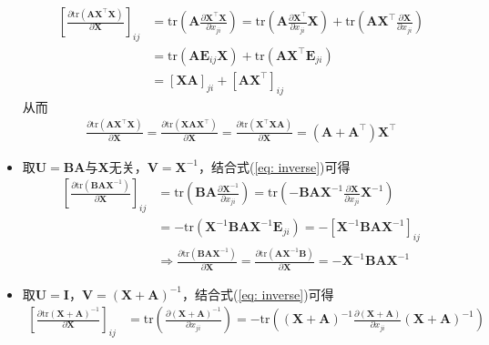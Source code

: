 \documentclass{ctexart}
\theoremstyle{definition}
\def \Av {\mathbf{A}}
\def \Bv {\mathbf{B}}
\def \Ev {\mathbf{E}}
\def \Iv {\mathbf{I}}
\def \Uv {\mathbf{U}}
\def \Vv {\mathbf{V}}
\def \Xv {\mathbf{X}}
\def \tr {\mathrm{tr}}
\begin{document}
\begin{itemize}
\begin{align*}
              \left[ \frac{\partial \tr(\Av \Xv^\top \Xv)}{\partial \Xv} \right]_{ij} & = \tr \left( \Av \frac{\partial \Xv^\top \Xv}{\partial x_{ji}} \right) = \tr \left( \Av \frac{\partial \Xv^\top}{\partial x_{ji}} \Xv \right) + \tr \left( \Av \Xv^\top \frac{\partial \Xv}{\partial x_{ji}} \right) \\
                                                                                      & = \tr(\Av \Ev_{ij} \Xv) + \tr(\Av \Xv^\top \Ev_{ji})                                                                                                                                                                 \\
                                                                                      & = [\Xv \Av]_{ji} + [\Av \Xv^\top]_{ij}
          \end{align*}
          从而
          \begin{align*}
              \frac{\partial \tr(\Av \Xv^\top \Xv)}{\partial \Xv} = \frac{\partial \tr(\Xv \Av \Xv^\top)}{\partial \Xv} = \frac{\partial \tr(\Xv^\top \Xv \Av)}{\partial \Xv} = (\Av + \Av^\top) \Xv^\top
          \end{align*}
    \item 取$\Uv = \Bv \Av$与$\Xv$无关，$\Vv = \Xv^{-1}$，结合式(\ref{eq: inverse})可得
          \begin{align*}
              \left[ \frac{\partial \tr(\Bv \Av \Xv^{-1})}{\partial \Xv} \right]_{ij} & = \tr \left( \Bv \Av \frac{\partial \Xv^{-1}}{\partial x_{ji}} \right) = \tr \left( - \Bv \Av \Xv^{-1} \frac{\partial \Xv}{\partial x_{ji}} \Xv^{-1} \right) \\
                                                                                      & = - \tr \left( \Xv^{-1} \Bv \Av \Xv^{-1} \Ev_{ji} \right) = - [\Xv^{-1} \Bv \Av \Xv^{-1}]_{ij}                                                               \\
                                                                                      & \Longrightarrow \frac{\partial \tr(\Bv \Av \Xv^{-1})}{\partial \Xv} = \frac{\partial \tr(\Av \Xv^{-1} \Bv)}{\partial \Xv} = - \Xv^{-1} \Bv \Av \Xv^{-1}
          \end{align*}
    \item 取$\Uv = \Iv$，$\Vv = (\Xv + \Av)^{-1}$，结合式(\ref{eq: inverse})可得
          \begin{align*}
              \left[ \frac{\partial \tr(\Xv + \Av)^{-1}}{\partial \Xv} \right]_{ij} & = \tr \left( \frac{\partial (\Xv + \Av)^{-1}}{\partial x_{ji}} \right) = - \tr \left( (\Xv + \Av)^{-1} \frac{\partial (\Xv + \Av)}{\partial x_{ji}} (\Xv + \Av)^{-1} \right) \\

\end{align*}
\end{itemize}
\end{document}
